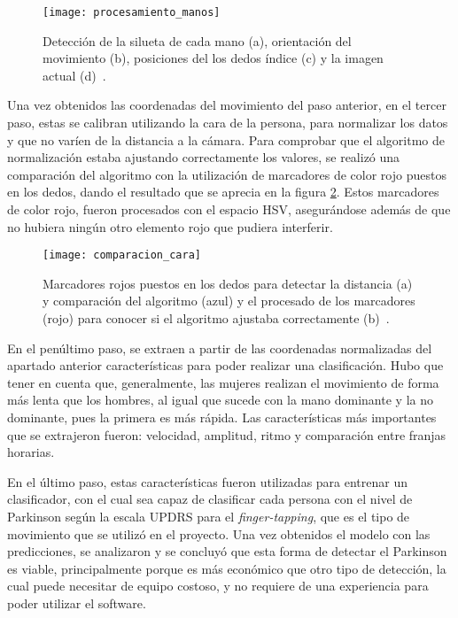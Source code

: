 \begin{figure}[h]
	\texttt{[image: procesamiento\_manos]}
	\caption{Detección de la silueta de cada mano (a), orientación del movimiento (b), posiciones del los dedos índice (c) y la imagen actual (d)~\cite{khan2014computer}.}
	\label{fig:procesamientomanos}
\end{figure}

Una vez obtenidos las coordenadas del movimiento del paso anterior, en el tercer paso, estas se calibran utilizando la cara de la persona, para normalizar los datos y que no varíen de la distancia a la cámara. Para comprobar que el algoritmo de normalización estaba ajustando correctamente los valores, se realizó una comparación del algoritmo con la utilización de marcadores de color rojo puestos en los dedos, dando el resultado que se aprecia en la figura \ref{fig:comparacioncara}. Estos marcadores de color rojo, fueron procesados con el espacio HSV, asegurándose además de que no hubiera ningún otro elemento rojo que pudiera interferir.

\begin{figure}[h]
	\texttt{[image: comparacion\_cara]}
	\caption{Marcadores rojos puestos en los dedos para detectar la distancia (a) y comparación del algoritmo (azul) y el procesado de los marcadores (rojo) para conocer si el algoritmo ajustaba correctamente (b)~\cite{khan2014computer}.}
	\label{fig:comparacioncara}
\end{figure}

En el penúltimo paso, se extraen a partir de las coordenadas normalizadas del apartado anterior características para poder realizar una clasificación. Hubo que tener en cuenta que, generalmente, las mujeres realizan el movimiento de forma más lenta que los hombres, al igual que sucede con la mano dominante y la no dominante, pues la primera es más rápida. Las características más importantes que se extrajeron fueron: velocidad, amplitud, ritmo y comparación entre franjas horarias.

En el último paso, estas características fueron utilizadas para entrenar un clasificador, con el cual sea capaz de clasificar cada persona con el nivel de Parkinson según la escala UPDRS para el \textit{finger-tapping}, que es el tipo de movimiento que se utilizó en el proyecto. Una vez obtenidos el modelo con las predicciones, se analizaron y se concluyó que esta forma de detectar el Parkinson es viable, principalmente porque es más económico que otro tipo de detección, la cual puede necesitar de equipo costoso, y no requiere de una experiencia para poder utilizar el software.

